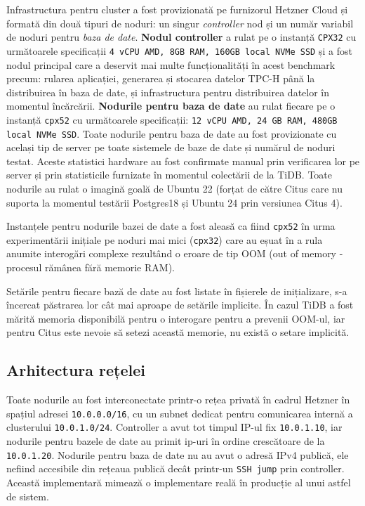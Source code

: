 Infrastructura pentru cluster a fost provizionată pe furnizorul Hetzner Cloud și formată din două tipuri de noduri: un singur \textit{controller} nod și un număr variabil de noduri pentru \textit{baza de date}. \textbf{Nodul controller} a rulat pe o instanță \texttt{CPX32} cu următoarele specificații \texttt{4 vCPU AMD, 8GB RAM, 160GB local NVMe SSD} și a fost nodul principal care a deservit mai multe funcționalități în acest benchmark precum: rularea aplicației, generarea și stocarea datelor TPC-H până la distribuirea în baza de date, și infrastructura pentru distribuirea datelor în momentul încărcării. \textbf{Nodurile pentru baza de date} au rulat fiecare pe o instanță \texttt{cpx52} cu următoarele specificații: \texttt{12 vCPU AMD, 24 GB RAM, 480GB local NVMe SSD}. Toate nodurile pentru baza de date au fost provizionate cu același tip de server pe toate sistemele de baze de date și numărul de noduri testat. Aceste statistici hardware au fost confirmate manual prin verificarea lor pe server și prin statisticile furnizate în momentul colectării de la TiDB. Toate nodurile au rulat o imagină goală de Ubuntu 22 (forțat de către Citus care nu suporta la momentul testării Postgres18 și Ubuntu 24 prin versiunea Citus 4).

Instanțele pentru nodurile bazei de date a fost aleasă ca fiind \texttt{cpx52} în urma experimentării inițiale pe noduri mai mici (\texttt{cpx32}) care au eșuat în a rula anumite interogări complexe rezultând o eroare de tip OOM (out of memory - procesul rămânea fără memorie RAM).

Setările pentru fiecare bază de date au fost listate în fișierele de inițializare, s-a încercat păstrarea lor cât mai aproape de setările implicite. În cazul TiDB a fost mărită memoria disponibilă pentru o interogare pentru a prevenii OOM-ul, iar pentru Citus este nevoie să setezi această memorie, nu există o setare implicită.

\subsection{Arhitectura rețelei}

Toate nodurile au fost interconectate printr-o rețea privată în cadrul Hetzner în spațiul adresei \texttt{10.0.0.0/16}, cu un subnet dedicat pentru comunicarea internă a clusterului \texttt{10.0.1.0/24}. Controller a avut tot timpul IP-ul fix \texttt{10.0.1.10}, iar nodurile pentru bazele de date au primit ip-uri în ordine crescătoare de la \texttt{10.0.1.20}. Nodurile pentru baza de date nu au avut o adresă IPv4 publică, ele nefiind accesibile din rețeaua publică decât printr-un \texttt{SSH jump} prin controller. Această implementară mimează o implementare reală în producție al unui astfel de sistem.


